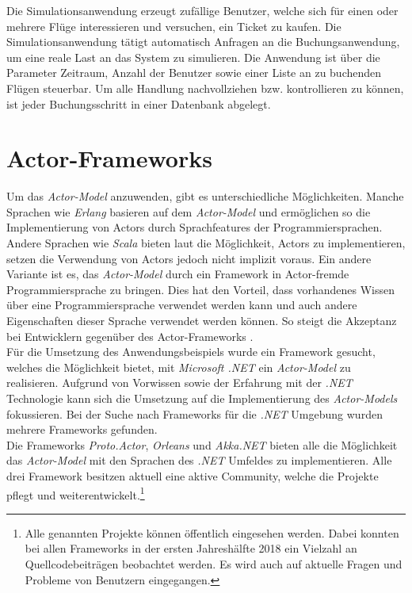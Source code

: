 Die Simulationsanwendung erzeugt zufällige Benutzer, welche sich für einen oder mehrere Flüge interessieren und versuchen, ein Ticket zu kaufen. Die Simulationsanwendung tätigt automatisch Anfragen an die Buchungsanwendung, um eine reale Last an das System zu simulieren. Die Anwendung ist über die Parameter Zeitraum, Anzahl der Benutzer sowie einer Liste an zu buchenden Flügen steuerbar. 
Um alle Handlung nachvollziehen bzw. kontrollieren zu können, ist jeder Buchungsschritt in einer Datenbank abgelegt.


\section{Actor-Frameworks}\label{sec:ActorFrameworks}
Um das \textit{Actor-Model} anzuwenden, gibt es unterschiedliche Möglichkeiten. Manche Sprachen wie \textit{Erlang} basieren auf dem \textit{Actor-Model} und ermöglichen so die Implementierung von Actors \citep{actorComparativeAnalysis} durch Sprachfeatures der Programmiersprachen. Andere Sprachen wie \textit{Scala} bieten laut \cite{haller2012actors} die Möglichkeit, Actors zu implementieren, setzen die Verwendung von Actors jedoch nicht implizit voraus. Ein andere Variante ist es, das \textit{Actor-Model} durch ein Framework in Actor-fremde Programmiersprache zu bringen. Dies hat den Vorteil, dass vorhandenes Wissen über eine Programmiersprache verwendet werden kann und auch andere Eigenschaften dieser Sprache verwendet werden können. So steigt die Akzeptanz bei Entwicklern gegenüber des Actor-Frameworks \citep{lee2006problem}. \\
Für die Umsetzung des Anwendungsbeispiels wurde ein Framework gesucht, welches die Möglichkeit bietet, mit \textit{Microsoft .NET} ein \textit{Actor-Model} zu realisieren. Aufgrund von Vorwissen sowie der Erfahrung mit der \textit{.NET} Technologie kann sich die Umsetzung auf die Implementierung des \textit{Actor-Models} fokussieren. Bei der Suche nach Frameworks für die \textit{.NET} Umgebung wurden mehrere Frameworks gefunden. \\
Die Frameworks \textit{Proto.Actor}, \textit{Orleans} und \textit{Akka.NET} bieten alle die Möglichkeit das \textit{Actor-Model} mit den Sprachen des \textit{.NET} Umfeldes zu implementieren. Alle drei Framework besitzen aktuell eine aktive Community, welche die Projekte pflegt und weiterentwickelt.\footnote{Alle genannten Projekte können öffentlich eingesehen werden. Dabei konnten bei allen Frameworks in der ersten Jahreshälfte 2018 ein Vielzahl an Quellcodebeiträgen beobachtet werden. Es wird auch auf aktuelle Fragen und Probleme von Benutzern eingegangen.}

